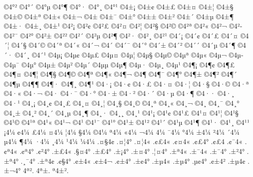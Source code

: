 {^^a94^^b0^^b2
^^a94^^b0^^b4
^^a94^^b0^^b5
^^a94^^b0^^b6
^^a94^^b0^^b7
^^a94^^b0^^b8
^^a94^^b0^^b9
^^a94^^b1^^a1
^^a94^^b1^^a2
^^a94^^b1^^a3
^^a94^^b1^^a4
^^a94^^b1^^a6
^^a94^^b1^^a7
^^a94^^b1^^a9
^^a94^^b1^^aa
^^a94^^b1^^ab
^^a94^^b1^^ac
^^a94^^b1^^ad
^^a94^^b1^^af
^^a94^^b1^^b0
^^a94^^b1^^b1
^^a94^^b1^^b2
^^a94^^b1^^b4
^^a94^^b1^^b5
^^a94^^b1^^b6
^^a94^^b1^^b7
^^a94^^b1^^b8
^^a94^^b1^^b9
^^a94^^b2^^a1
^^a94^^b2^^a2
^^a94^^b2^^a3
^^a94^^b2^^a4
^^a94^^b2^^a6
^^a94^^b2^^a7
^^a94^^b2^^a9
^^a94^^b2^^aa
^^a94^^b2^^ab
^^a94^^b2^^ac
^^a94^^b2^^ad
^^a94^^b2^^af
^^a94^^b2^^b0
^^a94^^b2^^b1
^^a94^^b2^^b2
^^a94^^b2^^b4
^^a94^^b2^^b5
^^a94^^b2^^b6
^^a94^^b2^^b7
^^a94^^b2^^b8
^^a94^^b2^^b9
^^a94^^b4^^a1
^^a94^^b4^^a2
^^a94^^b4^^a3
^^a94^^b4^^a4
^^a94^^b4^^a6
^^a94^^b4^^a7
^^a94^^b4^^a9
^^a94^^b4^^aa
^^a94^^b4^^ab
^^a94^^b4^^ac
^^a94^^b4^^ad
^^a94^^b4^^af
^^a94^^b4^^b0
^^a94^^b4^^b1
^^a94^^b4^^b2
^^a94^^b4^^b4
^^a94^^b4^^b5
^^a94^^b4^^b6
^^a94^^b4^^b7
^^a94^^b4^^b8
^^a94^^b4^^b9
^^a94^^b5^^a1
^^a94^^b5^^a2
^^a94^^b5^^a3
^^a94^^b5^^a4
^^a94^^b5^^a6
^^a94^^b5^^a7
^^a94^^b5^^a9
^^a94^^b5^^aa
^^a94^^b5^^ab
^^a94^^b5^^ac
^^a94^^b5^^ad
^^a94^^b5^^af
^^a94^^b5^^b0
^^a94^^b5^^b1
^^a94^^b5^^b2
^^a94^^b5^^b4
^^a94^^b5^^b5
^^a94^^b5^^b6
^^a94^^b5^^b7
^^a94^^b5^^b8
^^a94^^b5^^b9
^^a94^^b6^^a1
^^a94^^b6^^a2
^^a94^^b6^^a3
^^a94^^b6^^a4
^^a94^^b6^^a6
^^a94^^b6^^a7
^^a94^^b6^^a9
^^a94^^b6^^aa
^^a94^^b6^^ab
^^a94^^b6^^ac
^^a94^^b6^^ad
^^a94^^b6^^af
^^a94^^b6^^b0
^^a94^^b6^^b1
^^a94^^b6^^b2
^^a94^^b6^^b4
^^a94^^b6^^b5
^^a94^^b6^^b6
^^a94^^b6^^b7
^^a94^^b6^^b8
^^a94^^b6^^b9
^^a94^^b7^^a1
^^a94^^b7^^a2
^^a94^^b7^^a3
^^a94^^b7^^a4
^^a94^^b7^^a6
^^a94^^b7^^a7
^^a94^^b7^^a9
^^a94^^b7^^aa
^^a94^^b7^^ab
^^a94^^b7^^ac
^^a94^^b7^^ad
^^a94^^b7^^af
^^a94^^b7^^b0
^^a94^^b7^^b1
^^a94^^b7^^b2
^^a94^^b7^^b4
^^a94^^b7^^b5
^^a94^^b7^^b6
^^a94^^b7^^b7
^^a94^^b7^^b8
^^a94^^b7^^b9
^^a94^^b8^^a1
^^a94^^b8^^a2
^^a94^^b8^^a3
^^a94^^b8^^a4
^^a94^^b8^^a6
^^a94^^b8^^a7
^^a94^^b8^^a9
^^a94^^b8^^aa
^^a94^^b8^^ab
^^a94^^b8^^ac
^^a94^^b8^^ad
^^a94^^b8^^af
^^a94^^b8^^b0
^^a94^^b8^^b1
^^a94^^b8^^b2
^^a94^^b8^^b4
^^a94^^b8^^b5
^^a94^^b8^^b6
^^a94^^b8^^b7
^^a94^^b8^^b8
^^a94^^b8^^b9
^^a94^^b9^^a1
^^a94^^b9^^a2
^^a94^^b9^^a3
^^a94^^b9^^a4
^^a94^^b9^^a6
^^a94^^b9^^a7
^^a94^^b9^^a9
^^a94^^b9^^aa
^^a94^^b9^^ab
^^a94^^b9^^ac
^^a94^^b9^^ad
^^a94^^b9^^af
^^a94^^b9^^b0
^^a94^^b9^^b1
^^a94^^b9^^b2
^^a94^^b9^^b4
^^a94^^b9^^b5
^^a94^^b9^^b6
^^a94^^b9^^b7
^^a94^^b9^^b8
^^a94^^b9^^b9
^^a14^^bc
^^a24^^bc
^^a34^^bc
^^a44^^bc
^^a64^^bc
^^a74^^bc
^^a94^^bc
^^aa4^^bc
^^ab4^^bc
^^ac4^^bc
^^ad4^^bc
^^af4^^bc
^^b04^^bc
^^b14^^bc
^^b24^^bc
^^b44^^bc
^^b54^^bc
^^b64^^bc
^^b74^^bc
^^b84^^bc
^^b94^^bc
^^bc4^^bc
.^^a4^^a74^^a2
.^^a4^^a64^^b0
.^^a4^^a64^^ab
.^^a2^^a34^^ab
.^^a2^^a44^^ab
.^^a2^^a34^^b0
.^^a2^^a34^^ad
.^^a2^^af4^^ab
.^^a2^^aa4^^ab
.^^a2^^aa4^^b0
.^^a2^^b24^^b0
.^^b1^^a34^^ab
.^^a7^^a44^^b0
.^^b1^^a34^^b0
.^^b1^^a14^^b0
.^^b1^^a44^^b0
.^^a6^^a44^^b0
.^^b1^^aa4^^ab
.^^b1^^af4^^ab
.^^b1^^af4^^b0
.^^b1^^b24^^b0
.^^b1^^aa4^^b0
.^^b8^^af4^^b0
.^^b1^^aa4^^a2
.^^a2^^a74^^b0
.^^a2^^b14^^ab
.^^a2^^b14^^ac
.^^a2^^b14^^b0
.^^b1^^a24^^b0
.^^b1^^b54^^ab
.^^b1^^b54^^b0
.^^b5^^a24^^b0
.^^a2^^b14^^b2
.^^b1^^b54^^a2
.^^b1^^ac4^^b0
^^ad4^^aa^^b2.
^^ad4^^aa^^b1.
^^aa4^^b1^^b2.
}
